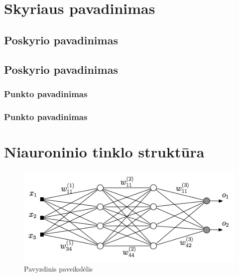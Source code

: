 \documentclass[12pt, a4paper, lithuanian]{article}
\begin{document}
\section{Skyriaus pavadinimas}
\subsection{Poskyrio pavadinimas}
\subsection{Poskyrio pavadinimas}
\subsubsection{Punkto pavadinimas}
\subsubsection{Punkto pavadinimas}







\appendix

\section{Niauroninio tinklo struktūra}
\begin{figure}[H]
    \centering
    \includegraphics[scale=0.5]{img/MLP}
    \caption{Pavyzdinis paveikslėlis}
    \label{img:mlp}
\end{figure}
\end{document}
